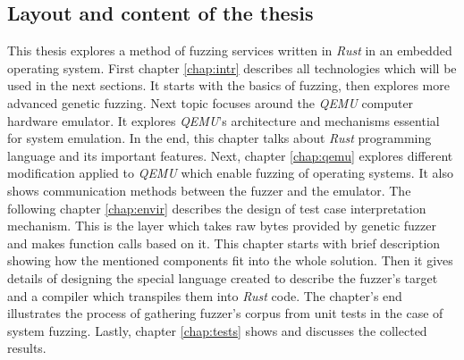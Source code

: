 \subsection{Layout and content of the thesis}
This thesis explores a method of fuzzing services written in \textit{Rust} in an embedded operating system. First chapter \ref{chap:intr} describes all technologies which will be used in the next sections. It starts with the basics of fuzzing, then explores more advanced genetic fuzzing. Next topic focuses around the \textit{QEMU} computer hardware emulator. It explores \textit{QEMU}'s architecture and mechanisms essential for system emulation. In the end, this chapter talks about \textit{Rust} programming language and its important features. Next, chapter \ref{chap:qemu} explores different modification applied to \textit{QEMU} which enable fuzzing of operating systems. It also shows communication methods between the fuzzer and the emulator. The following chapter \ref{chap:envir} describes the design of test case interpretation mechanism. This is the layer which takes raw bytes provided by genetic fuzzer and makes function calls based on it. This chapter starts with brief description showing how the mentioned components fit into the whole solution. Then it gives details of designing the special language created to describe the fuzzer's target and a compiler which transpiles them into \textit{Rust} code. The chapter's end illustrates the process of gathering fuzzer's corpus from unit tests in the case of system fuzzing. Lastly, chapter \ref{chap:tests} shows and discusses the collected results.
